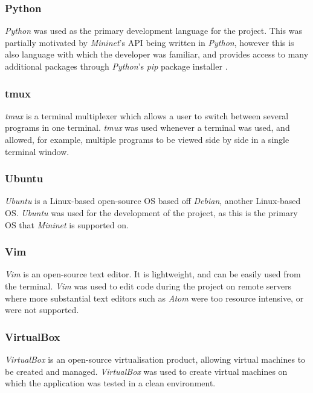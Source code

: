 \subsubsection{Python \cite{python}}
\textit{Python} was used as the primary development language for the project. This was partially motivated by \textit{Mininet}'s API being written in \textit{Python}, however this is also language with which the developer was familiar, and provides access to many additional packages through \textit{Python}'s \textit{pip} package installer \cite{pip}.

\subsubsection{tmux \cite{tmux}}
\textit{tmux} is a terminal multiplexer which allows a user to switch between several programs in one terminal. \textit{tmux} was used whenever a terminal was used, and allowed, for example, multiple programs to be viewed side by side in a single terminal window.

\subsubsection{Ubuntu \cite{ubuntu}}
\textit{Ubuntu} is a Linux-based open-source OS based off \textit{Debian}, another Linux-based OS. \textit{Ubuntu} was used for the development of the project, as this is the primary OS that \textit{Mininet} is supported on.

\subsubsection{Vim \cite{vim}}
\textit{Vim} is an open-source text editor. It is lightweight, and can be easily used from the terminal. \textit{Vim} was used to edit code during the project on remote servers where more substantial text editors such as \textit{Atom} were too resource intensive, or were not supported.

\subsubsection{VirtualBox \cite{virtualbox}}
\textit{VirtualBox} is an open-source virtualisation product, allowing virtual machines to be created and managed. \textit{VirtualBox} was used to create virtual machines on which the application was tested in a clean environment.

